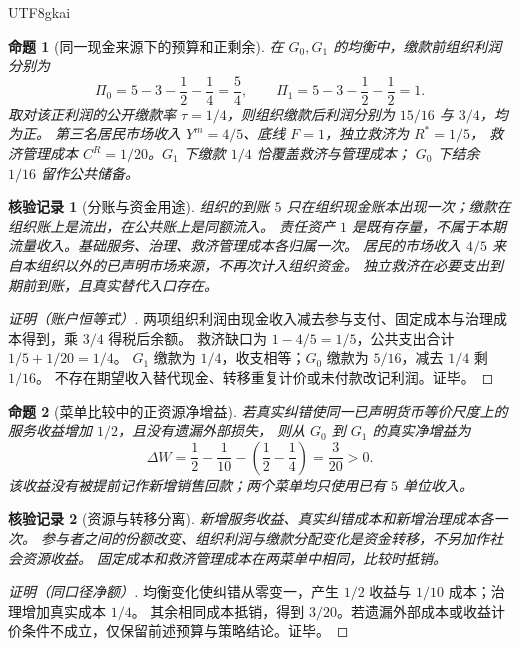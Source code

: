 \documentclass[12pt,a4paper,openany]{report}
\newtheorem{proposition}{命题}[chapter]
\newtheorem{Certificate}{核验记录}[chapter]
\begin{document}
\begin{CJK*}{UTF8}{gkai}
\begin{proposition}[同一现金来源下的预算和正剩余]
\label{prop:example-budget}
在 $G_0,G_1$ 的均衡中，缴款前组织利润分别为
\[
 \Pi_0=5-3-\frac12-\frac14=\frac54,
 \qquad
 \Pi_1=5-3-\frac12-\frac12=1.
\]
取对该正利润的公开缴款率 $\tau=1/4$，则组织缴款后利润分别为 $15/16$ 与 $3/4$，均为正。
第三名居民市场收入 $Y^m=4/5$、底线 $F=1$，独立救济为 $R^*=1/5$，
救济管理成本 $C^R=1/20$。$G_1$ 下缴款 $1/4$ 恰覆盖救济与管理成本；
$G_0$ 下结余 $1/16$ 留作公共储备。
\end{proposition}
\begin{Certificate}[分账与资金用途]
组织的到账 $5$ 只在组织现金账本出现一次；缴款在组织账上是流出，在公共账上是同额流入。
责任资产 $1$ 是既有存量，不属于本期流量收入。基础服务、治理、救济管理成本各归属一次。
居民的市场收入 $4/5$ 来自本组织以外的已声明市场来源，不再次计入组织资金。
独立救济在必要支出到期前到账，且真实替代入口存在。
\end{Certificate}
\begin{proof}[证明（账户恒等式）]
两项组织利润由现金收入减去参与支付、固定成本与治理成本得到，乘 $3/4$ 得税后余额。
救济缺口为 $1-4/5=1/5$，公共支出合计 $1/5+1/20=1/4$。
$G_1$ 缴款为 $1/4$，收支相等；$G_0$ 缴款为 $5/16$，减去 $1/4$ 剩 $1/16$。
不存在期望收入替代现金、转移重复计价或未付款改记利润。证毕。
\end{proof}

\begin{proposition}[菜单比较中的正资源净增益]
\label{prop:example-welfare}
若真实纠错使同一已声明货币等价尺度上的服务收益增加 $1/2$，且没有遗漏外部损失，
则从 $G_0$ 到 $G_1$ 的真实净增益为
\[
 \Delta W=\frac12-\frac1{10}-\left(\frac12-\frac14\right)=\frac3{20}>0.
\]
该收益没有被提前记作新增销售回款；两个菜单均只使用已有 $5$ 单位收入。
\end{proposition}
\begin{Certificate}[资源与转移分离]
新增服务收益、真实纠错成本和新增治理成本各一次。
参与者之间的份额改变、组织利润与缴款分配变化是资金转移，不另加作社会资源收益。
固定成本和救济管理成本在两菜单中相同，比较时抵销。
\end{Certificate}
\begin{proof}[证明（同口径净额）]
均衡变化使纠错从零变一，产生 $1/2$ 收益与 $1/10$ 成本；治理增加真实成本 $1/4$。
其余相同成本抵销，得到 $3/20$。若遗漏外部成本或收益计价条件不成立，仅保留前述预算与策略结论。证毕。
\end{proof}


\end{CJK*}
\end{document}

